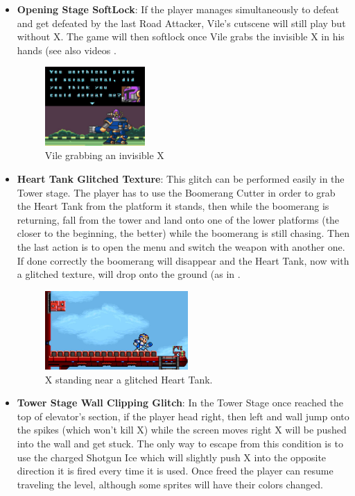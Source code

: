 \begin{itemize}
	\item \textbf{Opening Stage SoftLock}: If the player manages simultaneously to defeat and get defeated by the last Road Attacker, Vile's cutscene will still play but without X. The game will then softlock once Vile grabs the invisible X in his hands (see also videos .
	\begin{figure}[htp]
		\centering
		\includegraphics[height=3cm]{figures/X1/Miscs/Intro_softlock.jpg}
		\caption{Vile grabbing an invisible X}
	\end{figure}
	
	\item \textbf{Heart Tank Glitched Texture}: This glitch can be performed easily in the Tower stage. The player has to use the Boomerang Cutter in order to grab the Heart Tank from the platform it stands, then while the boomerang is returning, fall from the tower and land onto one of the lower platforms (the closer to the beginning, the better) while the boomerang is still chasing. Then the last action is to open the menu and switch the weapon with another one. If done correctly the boomerang will disappear and the Heart Tank, now with a glitched texture, will drop onto the ground (as in .
	\begin{figure}[htp]
		\centering
		\includegraphics[height=3cm]{figures/X1/Miscs/Tower_glitched_heart.jpg}
		\caption{X standing near a glitched Heart Tank.}
	\end{figure}
	\item \textbf{Tower Stage Wall Clipping Glitch}: In the Tower Stage once reached the top of elevator's section, if the player head right, then left and wall jump onto the spikes (which won't kill X) while the screen moves right X will be pushed into the wall and get stuck. The only way to escape from this condition is to use the charged Shotgun Ice which will slightly push X into the opposite direction it is fired every time it is used. Once freed the player can resume traveling the level, although some sprites will have their colors changed.
	

\end{itemize}
